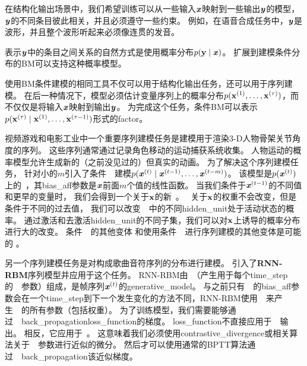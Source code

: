 在结构化输出场景中，我们希望训练可以从一些输入$\boldsymbol{\mathit{x}}$映射到一些输出$\boldsymbol{\mathit{y}}$的模型，$\boldsymbol{\mathit{y}}$的不同条目彼此相关，并且必须遵守一些约束。
例如，在语音合成任务中，$\boldsymbol{\mathit{y}}$是波形，并且整个波形听起来必须像连贯的发音。

表示$\boldsymbol{\mathit{y}}$中的条目之间关系的自然方式是使用概率分布$p(\mathbf{y}  \mid  \boldsymbol{\mathit{x}})$。
扩展到建模条件分布的\gls{BM}可以支持这种概率模型。

使用\gls{BM}条件建模的相同工具不仅可以用于结构化输出任务，还可以用于序列建模。 
在后一种情况下，模型必须估计变量序列上的概率分布$p(\mathbf{x}^{(1)}, \dots, \mathbf{x}^{(\tau)})$，而不仅仅是将输入$\boldsymbol{\mathit{x}}$映射到输出$\boldsymbol{\mathit{y}}$。
为完成这个任务，条件\gls{BM}可以表示$p(\mathbf{x}^{(\tau)}  \mid  \mathbf{x}^{(1)}, \dots, \mathbf{x}^{(\tau-1)})$形式的\gls{factor}。

视频游戏和电影工业中一个重要序列建模任务是建模用于渲染3-D人物骨架关节角度的序列。 
这些序列通常通过记录角色移动的运动捕获系统收集。
人物运动的概率模型允许生成新的（之前没见过的）但真实的动画。
为了解决这个序列建模任务，\citet{Taylor+2007} 针对小的$m$引入了条件~~建模$p(\boldsymbol{\mathit{x}}^{(t)}  \mid  \boldsymbol{\mathit{x}}^{(t-1)}, \dots, \boldsymbol{\mathit{x}}^{(t-m)})$。
该模型是$p(\boldsymbol{\mathit{x}}^{(t)})$上的~，其\gls{bias_aff}参数是$\boldsymbol{\mathit{x}}$前面$m$个值的线性函数。
当我们条件于$\boldsymbol{\mathit{x}}^{(t-1)}$的不同值和更早的变量时， 我们会得到一个关于$\mathbf{x}$的新~。
~关于$\mathbf{x}$的权重不会改变，但是条件于不同的过去值， 我们可以改变~~中的不同\gls{hidden_unit}处于活动状态的概率。
通过激活和去激活\gls{hidden_unit}的不同子集，我们可以对$\mathbf{x}$上诱导的概率分布进行大的改变。
条件~~的其他变体 \citep{Mnih-2011} 和使用条件~~进行序列建模的其他变体是可能的 \citep{TaylorHintonICML2009,SutskeverHintonTaylor2009-small,Boulanger-et-al-ICML2012}。

另一个序列建模任务是对构成歌曲音符序列的分布进行建模。
\citet{Boulanger-et-al-ICML2012} 引入了\textbf{RNN-RBM}序列模型并应用于这个任务。
RNN-RBM由~（产生用于每个\gls{time_step}的~~参数）组成，是帧序列$\boldsymbol{\mathit{x}}^{(t)}$的\gls{generative_model}。
与之前只有~~的\gls{bias_aff}参数会在一个\gls{time_step}到下一个发生变化的方法不同，RNN-RBM使用~~来产生~~的所有参数（包括权重）。
为了训练模型，我们需要能够通过~~\gls{back_propagation}\gls{loss_function}的梯度。
\gls{loss_function}不直接应用于~~输出。
相反，它应用于~。
这意味着我们必须使用\gls{contrastive_divergence}或相关算法关于~~参数进行近似的微分。
然后才可以使用通常的\gls{BPTT}算法通过~~\gls{back_propagation}该近似梯度。

